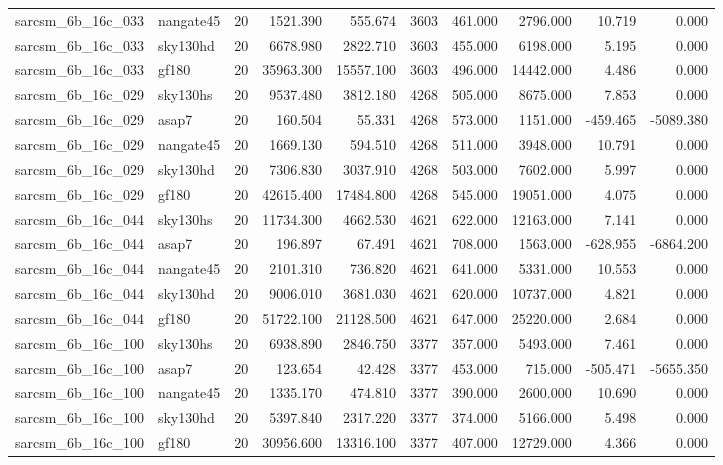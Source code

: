 \documentclass{article}
\begin{document}
\begin{longtable}{llrrrrrrrr}
sarcsm\_6b\_16c\_033 & nangate45 & 20 & 1521.390 & 555.674 & 3603 & 461.000 & 2796.000 & 10.719 & 0.000 \\
sarcsm\_6b\_16c\_033 & sky130hd & 20 & 6678.980 & 2822.710 & 3603 & 455.000 & 6198.000 & 5.195 & 0.000 \\
sarcsm\_6b\_16c\_033 & gf180 & 20 & 35963.300 & 15557.100 & 3603 & 496.000 & 14442.000 & 4.486 & 0.000 \\
sarcsm\_6b\_16c\_029 & sky130hs & 20 & 9537.480 & 3812.180 & 4268 & 505.000 & 8675.000 & 7.853 & 0.000 \\
sarcsm\_6b\_16c\_029 & asap7 & 20 & 160.504 & 55.331 & 4268 & 573.000 & 1151.000 & -459.465 & -5089.380 \\
sarcsm\_6b\_16c\_029 & nangate45 & 20 & 1669.130 & 594.510 & 4268 & 511.000 & 3948.000 & 10.791 & 0.000 \\
sarcsm\_6b\_16c\_029 & sky130hd & 20 & 7306.830 & 3037.910 & 4268 & 503.000 & 7602.000 & 5.997 & 0.000 \\
sarcsm\_6b\_16c\_029 & gf180 & 20 & 42615.400 & 17484.800 & 4268 & 545.000 & 19051.000 & 4.075 & 0.000 \\
sarcsm\_6b\_16c\_044 & sky130hs & 20 & 11734.300 & 4662.530 & 4621 & 622.000 & 12163.000 & 7.141 & 0.000 \\
sarcsm\_6b\_16c\_044 & asap7 & 20 & 196.897 & 67.491 & 4621 & 708.000 & 1563.000 & -628.955 & -6864.200 \\
sarcsm\_6b\_16c\_044 & nangate45 & 20 & 2101.310 & 736.820 & 4621 & 641.000 & 5331.000 & 10.553 & 0.000 \\
sarcsm\_6b\_16c\_044 & sky130hd & 20 & 9006.010 & 3681.030 & 4621 & 620.000 & 10737.000 & 4.821 & 0.000 \\
sarcsm\_6b\_16c\_044 & gf180 & 20 & 51722.100 & 21128.500 & 4621 & 647.000 & 25220.000 & 2.684 & 0.000 \\
sarcsm\_6b\_16c\_100 & sky130hs & 20 & 6938.890 & 2846.750 & 3377 & 357.000 & 5493.000 & 7.461 & 0.000 \\
sarcsm\_6b\_16c\_100 & asap7 & 20 & 123.654 & 42.428 & 3377 & 453.000 & 715.000 & -505.471 & -5655.350 \\
sarcsm\_6b\_16c\_100 & nangate45 & 20 & 1335.170 & 474.810 & 3377 & 390.000 & 2600.000 & 10.690 & 0.000 \\
sarcsm\_6b\_16c\_100 & sky130hd & 20 & 5397.840 & 2317.220 & 3377 & 374.000 & 5166.000 & 5.498 & 0.000 \\
sarcsm\_6b\_16c\_100 & gf180 & 20 & 30956.600 & 13316.100 & 3377 & 407.000 & 12729.000 & 4.366 & 0.000 \\

\end{longtable}
\end{document}
